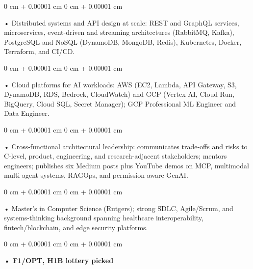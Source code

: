 \documentclass[10pt, letterpaper]{article}
\newenvironment{onecolentry}{
    \begin{adjustwidth}{
        0 cm + 0.00001 cm
    }{
        0 cm + 0.00001 cm
    }
}{
    \end{adjustwidth}
} %
\begin{document}
        \begin{onecolentry}
            • Distributed systems and API design at scale: REST and GraphQL services, microservices, event-driven and streaming architectures (RabbitMQ, Kafka), PostgreSQL and NoSQL (DynamoDB, MongoDB, Redis), Kubernetes, Docker, Terraform, and CI/CD.
        \end{onecolentry}
        \begin{onecolentry}
            • Cloud platforms for AI workloads: AWS (EC2, Lambda, API Gateway, S3, DynamoDB, RDS, Bedrock, CloudWatch) and GCP (Vertex AI, Cloud Run, BigQuery, Cloud SQL, Secret Manager); GCP Professional ML Engineer and Data Engineer.
        \end{onecolentry}
        \begin{onecolentry}
            • Cross-functional architectural leadership: communicates trade-offs and risks to C-level, product, engineering, and research-adjacent stakeholders; mentors engineers; publishes six Medium posts plus YouTube demos on MCP, multimodal multi-agent systems, RAGOps, and permission-aware GenAI.
        \end{onecolentry}
        \begin{onecolentry}
            • Master's in Computer Science (Rutgers); strong SDLC, Agile/Scrum, and systems-thinking background spanning healthcare interoperability, fintech/blockchain, and edge security platforms.
        \end{onecolentry}
        \begin{onecolentry}
                \textbf{• F1/OPT, H1B lottery picked}
        \end{onecolentry}

    \vspace{2 pt }
\end{document}
